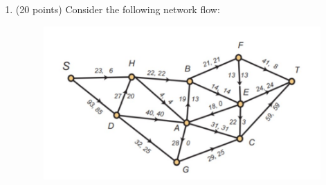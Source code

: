 \documentclass[12pt]{article}
\begin{document}
\begin{enumerate}
    \pagebreak

    \item (20 points) Consider the following network flow:

    \begin{figure}[H]
      \begin{center}
        \includegraphics{media/Network Flow.jpg}
      \end{center}
    \end{figure}


\end{enumerate}
\end{document}
